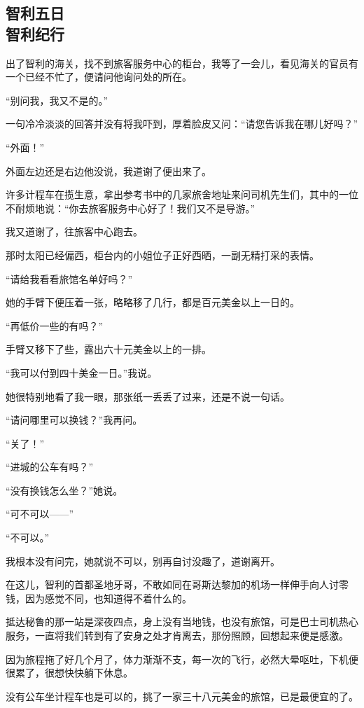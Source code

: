 \subsection{智利五日\\\small{智利纪行}}

\par 出了智利的海关，找不到旅客服务中心的柜台，我等了一会儿，看见海关的官员有一个已经不忙了，便请问他询问处的所在。
\par “别问我，我又不是的。”
\par 一句冷冷淡淡的回答并没有将我吓到，厚着脸皮又问：“请您告诉我在哪儿好吗？”
\par “外面！”
\par 外面左边还是右边他没说，我道谢了便出来了。
\par 许多计程车在揽生意，拿出参考书中的几家旅舍地址来问司机先生们，其中的一位不耐烦地说：“你去旅客服务中心好了！我们又不是导游。”
\par 我又道谢了，往旅客中心跑去。
\par 那时太阳已经偏西，柜台内的小姐位子正好西晒，一副无精打采的表情。
\par “请给我看看旅馆名单好吗？”
\par 她的手臂下便压着一张，略略移了几行，都是百元美金以上一日的。
\par “再低价一些的有吗？”
\par 手臂又移下了些，露出六十元美金以上的一排。
\par “我可以付到四十美金一日。”我说。
\par 她很特别地看了我一眼，那张纸一丢丢了过来，还是不说一句话。
\par “请问哪里可以换钱？”我再问。
\par “关了！”
\par “进城的公车有吗？”
\par “没有换钱怎么坐？”她说。
\par “可不可以——”
\par “不可以。”
\par 我根本没有问完，她就说不可以，别再自讨没趣了，道谢离开。
\par 在这儿，智利的首都圣地牙哥，不敢如同在哥斯达黎加的机场一样伸手向人讨零钱，因为感觉不同，也知道得不着什么的。
\par 抵达秘鲁的那一站是深夜四点，身上没有当地钱，也没有旅馆，可是巴士司机热心服务，一直将我们转到有了安身之处才肯离去，那份照顾，回想起来便是感激。
\par 因为旅程拖了好几个月了，体力渐渐不支，每一次的飞行，必然大晕呕吐，下机便很累了，很想快快躺下休息。
\par 没有公车坐计程车也是可以的，挑了一家三十八元美金的旅馆，已是最便宜的了。
